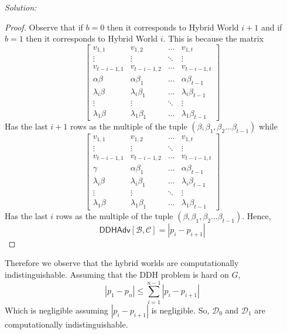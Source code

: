 \documentclass[a4paper, 11pt]{article}
\newenvironment{solution}
    {\textit{Solution:}}
    {\clearpage}
\newcommand{\calB}{\mathcal{B}}
\newcommand{\calC}{\mathcal{C}}
\newcommand{\calD}{\mathcal{D}}
\begin{document}
\begin{solution}
\begin{enumerate}[(a)]
\begin{proof}
                  Observe that if $b=0$ then it corresponds to Hybrid World $i+1$ and if $b=1$ then it corresponds to Hybrid World $i$. This is because the matrix
                  $$
                      \begin{bmatrix}
                          {v_{1,1}}        & {v_{1,2}}          & \dots  & {v_{1,t}}              \\
                          \vdots           & \vdots             & \ddots & \vdots                 \\
                          {v_{t-i-1,1}}    & {v_{t-i-1,2}}      & \dots  & {v_{t-i-1,t}}          \\
                          \alpha\beta      & {\alpha\beta_1}    & \dots  & {\alpha\beta_{t-1}}    \\
                          {\lambda_i\beta} & {\lambda_i\beta_1} & \dots  & {\lambda_i\beta_{t-1}} \\
                          \vdots           & \vdots             & \ddots & \vdots                 \\
                          {\lambda_1\beta} & {\lambda_1\beta_1} & \dots  & {\lambda_1\beta_{t-1}}
                      \end{bmatrix}
                  $$
                  Has the last $i+1$ rows as the multiple of the tuple $(\beta, \beta_1, \beta_2\dots\beta_{t-1})$ while
                  $$
                      \begin{bmatrix}
                          {v_{1,1}}        & {v_{1,2}}          & \dots  & {v_{1,t}}              \\
                          \vdots           & \vdots             & \ddots & \vdots                 \\
                          {v_{t-i-1,1}}    & {v_{t-i-1,2}}      & \dots  & {v_{t-i-1,t}}          \\
                          \gamma           & {\alpha\beta_1}    & \dots  & {\alpha\beta_{t-1}}    \\
                          {\lambda_i\beta} & {\lambda_i\beta_1} & \dots  & {\lambda_i\beta_{t-1}} \\
                          \vdots           & \vdots             & \ddots & \vdots                 \\
                          {\lambda_1\beta} & {\lambda_1\beta_1} & \dots  & {\lambda_1\beta_{t-1}}
                      \end{bmatrix}
                  $$
                  Has the last $i$ rows as the multiple of the tuple $(\beta, \beta_1, \beta_2\dots\beta_{t-1})$. Hence, $$\mathsf{DDHAdv}[\calB, \calC]=|p_i-p_{i+1}|$$
              \end{proof}
              \vspace{20pt}
              Therefore we observe that the hybrid worlds are computationally indistinguishable. Assuming that the DDH problem is hard on $G$,
              $$|p_1-p_{n}|\leq \sum_{i=1}^{n-1}|p_i-p_{i+1}|$$
              Which is negligible assuming $|p_i-p_{i+1}|$ is negligible. So, $\calD_0$ and $\calD_1$ are computationally indistinguishable.




\end{enumerate}
\end{solution}
\end{document}
